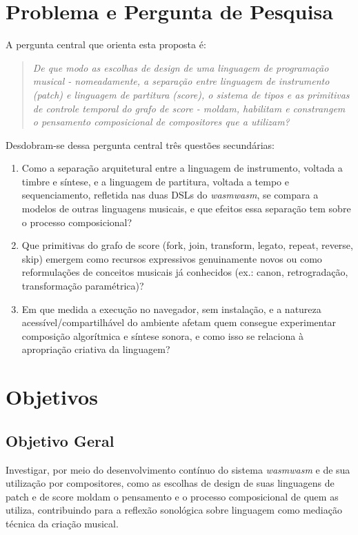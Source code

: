 \documentclass[12pt,a4paper]{article}
\begin{document}
\section{Problema e Pergunta de Pesquisa}

A pergunta central que orienta esta proposta é:

\begin{quote}
\emph{De que modo as escolhas de design de uma linguagem de programação musical - nomeadamente, a separação entre linguagem de instrumento (patch) e linguagem de partitura (score), o sistema de tipos e as primitivas de controle temporal do grafo de score - moldam, habilitam e constrangem o pensamento composicional de compositores que a utilizam?}
\end{quote}

Desdobram-se dessa pergunta central três questões secundárias:

\begin{enumerate}
  \item Como a separação arquitetural entre a linguagem de instrumento, voltada a timbre e síntese, e a linguagem de partitura, voltada a tempo e sequenciamento, refletida nas duas DSLs do \emph{wasmwasm}, se compara a modelos de outras linguagens musicais, e que efeitos essa separação tem sobre o processo composicional?
  \item Que primitivas do grafo de score (fork, join, transform, legato, repeat, reverse, skip) emergem como recursos expressivos genuinamente novos ou como reformulações de conceitos musicais já conhecidos (ex.: canon, retrogradação, transformação paramétrica)?
  \item Em que medida a execução no navegador, sem instalação, e a natureza acessível/compartilhável do ambiente afetam quem consegue experimentar composição algorítmica e síntese sonora, e como isso se relaciona à apropriação criativa da linguagem?
\end{enumerate}

\section{Objetivos}

\subsection{Objetivo Geral}

Investigar, por meio do desenvolvimento contínuo do sistema \emph{wasmwasm} e de sua utilização por compositores, como as escolhas de design de suas linguagens de patch e de score moldam o pensamento e o processo composicional de quem as utiliza, contribuindo para a reflexão sonológica sobre linguagem como mediação técnica da criação musical.
\end{document}
